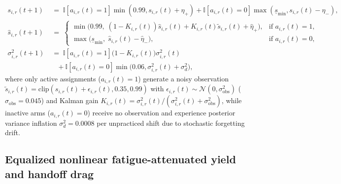 \documentclass[11pt]{article}
\begin{document}
\begin{equation}
\begin{aligned}
s_{i,r}(t+1) &\;=\; \mathbb{I}[a_{i,r}(t)=1]\min(0.99, s_{i,r}(t) + \eta_+) + \mathbb{I}[a_{i,r}(t)=0]\max(\underline{s}_{\min}, s_{i,r}(t) - \eta_-), \\
\hat{s}_{i,r}(t+1) &\;=\; \begin{cases} \min\!\bigl(0.99,\; (1 - K_{i,r}(t))\hat{s}_{i,r}(t) + K_{i,r}(t)\tilde{s}_{i,r}(t) + \hat{\eta}_+\bigr), & \text{if } a_{i,r}(t)=1, \\
\max\!\bigl(\underline{s}_{\min},\; \hat{s}_{i,r}(t) - \hat{\eta}_-\bigr), & \text{if } a_{i,r}(t)=0,
\end{cases} \\
\sigma_{i,r}^2(t+1) &\;=\; \mathbb{I}[a_{i,r}(t)=1]\bigl(1 - K_{i,r}(t)\bigr)\sigma_{i,r}^2(t) \\
&\quad + \mathbb{I}[a_{i,r}(t)=0]\min\!\bigl(0.06, \sigma_{i,r}^2(t) + \sigma_d^2\bigr),
\end{aligned}
\label{eq:skill_dyn}
\end{equation}
where only active assignments ($a_{i,r}(t)=1$) generate a noisy observation $\tilde{s}_{i,r}(t) = \mathrm{clip}(s_{i,r}(t) + \epsilon_{i,r}(t),\allowbreak 0.35,\allowbreak 0.99)$ with $\epsilon_{i,r}(t) \sim \mathcal{N}(0,\allowbreak \sigma_{\mathrm{obs}}^2)$ ($\sigma_{\mathrm{obs}} = 0.045$) and Kalman gain $K_{i,r}(t) = \sigma_{i,r}^2(t)/(\sigma_{i,r}^2(t) + \sigma_{\mathrm{obs}}^2)$, while inactive arms ($a_{i,r}(t)=0$) receive no observation and experience posterior variance inflation $\sigma_d^2 = 0.0008$ per unpracticed shift due to stochastic forgetting drift.

\subsection{Equalized nonlinear fatigue-attenuated yield and handoff drag}
\end{document}
